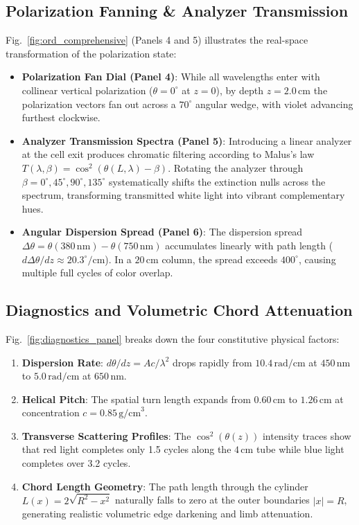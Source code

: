 \documentclass[twocolumn,10pt,a4paper]{article}
\begin{document}
\subsection{Polarization Fanning \& Analyzer Transmission}
Fig.~\ref{fig:ord_comprehensive} (Panels 4 and 5) illustrates the real-space transformation of the polarization state:
\begin{itemize}[leftmargin=*]
  \item \textbf{Polarization Fan Dial (Panel 4)}: While all wavelengths enter with collinear vertical polarization ($\theta = 0^\circ$ at $z = 0$), by depth $z = 2.0\,\text{cm}$ the polarization vectors fan out across a $70^\circ$ angular wedge, with violet advancing furthest clockwise.
  \item \textbf{Analyzer Transmission Spectra (Panel 5)}: Introducing a linear analyzer at the cell exit produces chromatic filtering according to Malus's law $T(\lambda, \beta) = \cos^2(\theta(L, \lambda) - \beta)$. Rotating the analyzer through $\beta = 0^\circ, 45^\circ, 90^\circ, 135^\circ$ systematically shifts the extinction nulls across the spectrum, transforming transmitted white light into vibrant complementary hues.
  \item \textbf{Angular Dispersion Spread (Panel 6)}: The dispersion spread $\Delta\theta = \theta(380\,\text{nm}) - \theta(750\,\text{nm})$ accumulates linearly with path length ($d\Delta\theta/dz \approx 20.3^\circ/\text{cm}$). In a $20\,\text{cm}$ column, the spread exceeds $400^\circ$, causing multiple full cycles of color overlap.
\end{itemize}

\subsection{Diagnostics and Volumetric Chord Attenuation}
Fig.~\ref{fig:diagnostics_panel} breaks down the four constitutive physical factors:
\begin{enumerate}[label=(\alph*), leftmargin=*]
  \item \textbf{Dispersion Rate}: $d\theta/dz = A c / \lambda^2$ drops rapidly from $10.4\,\text{rad/cm}$ at $450\,\text{nm}$ to $5.0\,\text{rad/cm}$ at $650\,\text{nm}$.
  \item \textbf{Helical Pitch}: The spatial turn length expands from $0.60\,\text{cm}$ to $1.26\,\text{cm}$ at concentration $c = 0.85\,\text{g/cm}^3$.
  \item \textbf{Transverse Scattering Profiles}: The $\cos^2(\theta(z))$ intensity traces show that red light completes only 1.5 cycles along the $4\,\text{cm}$ tube while blue light completes over 3.2 cycles.
  \item \textbf{Chord Length Geometry}: The path length through the cylinder $L(x) = 2\sqrt{R^2 - x^2}$ naturally falls to zero at the outer boundaries $|x| = R$, generating realistic volumetric edge darkening and limb attenuation.
\end{enumerate}
\end{document}

